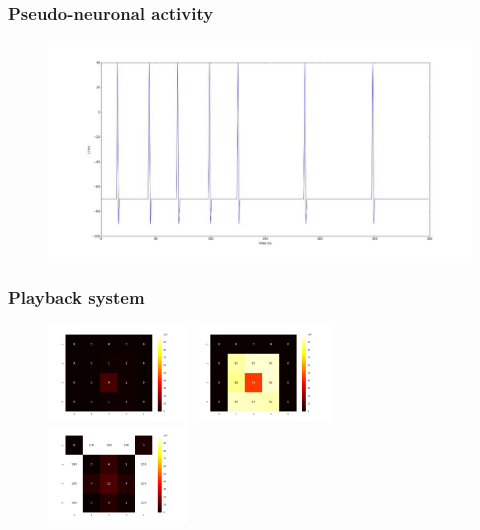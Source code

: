 \documentclass[12pt, aspectratio=169]{beamer}
\begin{document}

\begin{frame}
\frametitle{Pseudo-neuronal activity}
\begin{figure}
\includegraphics[width=0.8\linewidth]{pseudo-neuronal-activity}
\end{figure}
\end{frame}


\begin{frame}
\frametitle{Playback system}
\begin{figure}
\includegraphics[width=0.33\textwidth]{layer5A_1}
\includegraphics[width=0.33\textwidth]{layer5A_2}
\includegraphics[width=0.33\textwidth]{layer5A_3}
\end{figure}
\end{frame}
\end{document}
